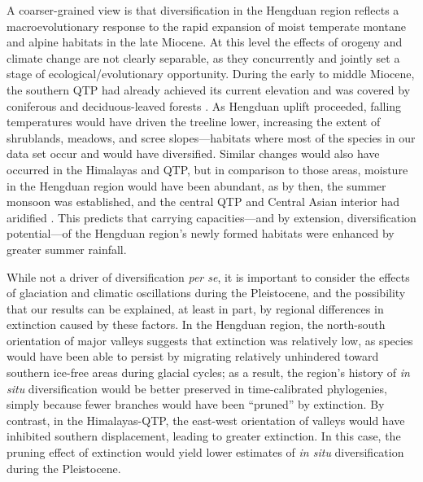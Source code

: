 \documentclass[9pt,twocolumn,twoside,lineno]{pnas-new}
\begin{document}
A coarser-grained view is that diversification in the Hengduan region
reflects a macroevolutionary response to the rapid expansion of moist
temperate montane and alpine habitats in the late Miocene. At this
level the effects of orogeny and climate change are not clearly
separable, as they concurrently and jointly set a stage of
ecological/evolutionary opportunity. During the early to middle
Miocene, the southern QTP had already achieved its current elevation
\citep{Spicer2003} and was covered by coniferous and deciduous-leaved
forests
\citep{SunJ2014,LiH1976}%
. As Hengduan uplift proceeded, falling temperatures would have driven
the treeline lower, increasing the extent of shrublands, meadows, and
scree slopes---habitats where most of the species in our data set
occur and would have diversified. Similar changes would also have
occurred in the Himalayas and QTP, but in comparison to those areas,
moisture in the Hengduan region would have been abundant, as by then,
the summer monsoon was established, and the central QTP and Central
Asian interior had aridified \citep[see][]{Renner2016}. This predicts
that carrying capacities---and by extension, diversification
potential---of the Hengduan region's newly formed habitats were
enhanced by greater summer rainfall.


While not a driver of diversification \textit{per se}, it is important
to consider the effects of glaciation and climatic oscillations during
the Pleistocene, and the possibility that our results can be
explained, at least in part, by regional differences in extinction
caused by these factors. In the Hengduan region, the north-south
orientation of major valleys suggests that extinction was relatively
low, as species would have been able to persist by migrating
relatively unhindered toward southern ice-free areas during glacial
cycles; as a result, the region's history of \textit{in situ}
diversification would be better preserved in time-calibrated
phylogenies, simply because fewer branches would have been ``pruned''
by extinction. By contrast, in the Himalayas-QTP, the east-west
orientation of valleys would have inhibited southern displacement,
leading to greater extinction. In this case, the pruning effect of
extinction would yield lower estimates of \textit{in situ}
diversification during the Pleistocene.
\end{document}
